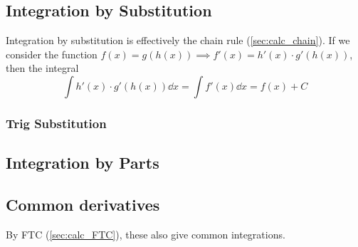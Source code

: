 \documentclass[fleqn,a4paper,11pt]{article}
\begin{document}
    \subsection{Integration by Substitution} \label{sec:calc_substitution}

    Integration by substitution is effectively the chain rule
    (\ref{sec:calc_chain}). If we consider the function
    \(f(x) = g(h(x)) \implies f'(x) = h'(x) \cdot g'(h(x))\), then the integral
    \begin{equation}
    \int h'(x) \cdot g'(h(x)) \dd{x} = \int f'(x) \dd{x} = f(x) + C
    \end{equation}

    \subsubsection{Trig Substitution} \label{sec:calc_trig_substitution}

    \subsection{Integration by Parts}

    \subsection{Common derivatives} \label{calc:common}


    By FTC (\ref{sec:calc_FTC}), these also give common integrations.
\end{document}
